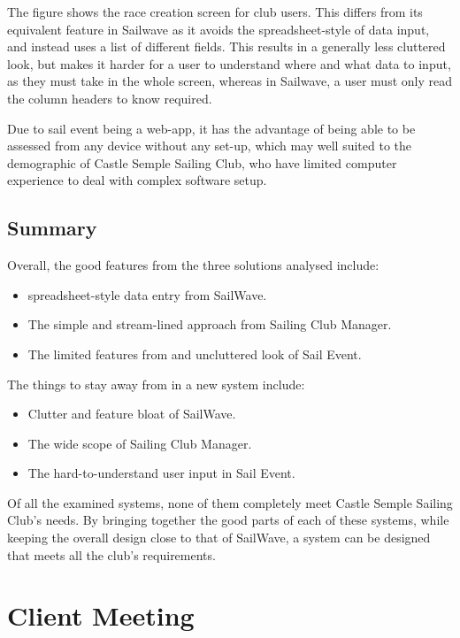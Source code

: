 \documentclass{l4proj}
\begin{document}
The figure shows the race creation screen for club users. This differs from its equivalent feature in Sailwave as it avoids the spreadsheet-style of data input, and instead uses a list of different fields. This results in a generally less cluttered look, but makes it harder for a user to understand where and what data to input, as they must take in the whole screen, whereas in Sailwave, a user must only read the column headers to know required.

Due to sail event being a web-app, it has the advantage of being able to be assessed from any device without any set-up, which may well suited to the demographic of Castle Semple Sailing Club, who have limited computer experience to deal with complex software setup.

\subsection{Summary}

Overall, the good features from the three solutions analysed include:
\begin{itemize}
    \item
    spreadsheet-style data entry from SailWave.
    \item
    The simple and stream-lined approach from Sailing Club Manager.
    \item
    The limited features from and uncluttered look of Sail Event.
\end{itemize}

The things to stay away from in a new system include:
\begin{itemize}
    \item
    Clutter and feature bloat of SailWave. 
    \item
    The wide scope of Sailing Club Manager.
    \item
    The hard-to-understand user input in Sail Event.
\end{itemize}

Of all the examined systems, none of them completely meet Castle Semple Sailing Club's needs. By bringing together the good parts of each of these systems, while keeping the overall design close to that of SailWave, a system can be designed that meets all the club's requirements.

\section{Client Meeting}
\end{document}
